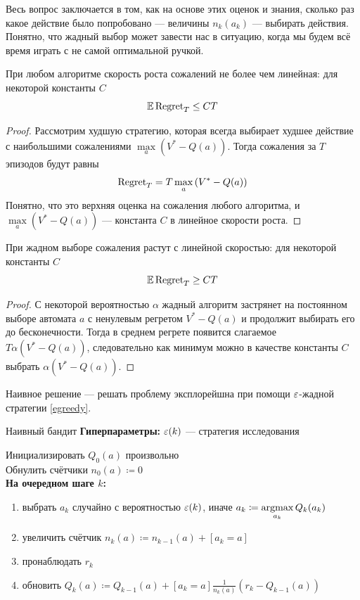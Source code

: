Весь вопрос заключается в том, как на основе этих оценок и знания, сколько раз какое действие было попробовано --- величины $n_k(a_k)$ --- выбирать действия. Понятно, что жадный выбор может завести нас в ситуацию, когда мы будем всё время играть с не самой оптимальной ручкой.

\begin{proposition}
При любом алгоритме скорость роста сожалений не более чем линейная: для некоторой константы $C$
$$\mathbb{E} \operatorname{Regret}_T \le CT$$
\begin{proof}
Рассмотрим худшую стратегию, которая всегда выбирает худшее действие с наибольшими сожалениями $\max\limits_a \left( V^* - Q(a) \right)$. Тогда сожаления за $T$ эпизодов будут равны
$$\operatorname{Regret}_T = T \max\limits_a \left( V^* - Q(a) \right)$$
Понятно, что это верхняя оценка на сожаления любого алгоритма, и $\max\limits_a \left( V^* - Q(a) \right)$ --- константа $C$ в линейное скорости роста.
\end{proof}
\end{proposition}

\begin{proposition}
При жадном выборе сожаления растут с линейной скоростью: для некоторой константы $C$
$$\mathbb{E} \operatorname{Regret}_T \ge CT$$
\begin{proof}
С некоторой вероятностью $\alpha$ жадный алгоритм застрянет на постоянном выборе автомата $a$ с ненулевым регретом $V^* - Q(a)$ и продолжит выбирать его до бесконечности. Тогда в среднем регрете появится слагаемое $T \alpha (V^* - Q(a))$, следовательно как минимум можно в качестве константы $C$ выбрать $\alpha (V^* - Q(a))$.
\end{proof}
\end{proposition}

Наивное решение --- решать проблему эксплорейшна при помощи $\varepsilon$-жадной стратегии \ref{egreedy}.

\begin{algorithm}{Наивный бандит}
\textbf{Гиперпараметры:} $\varepsilon(k)$ --- стратегия исследования

\vspace{0.3cm}
Инициализировать $Q_0(a)$ произвольно \\
Обнулить счётчики $n_0(a) \coloneqq 0$ \\
\textbf{На очередном шаге $k$:}
\begin{enumerate}
    \item выбрать $a_k$ случайно с вероятностью $\varepsilon(k)$, иначе $a_k \coloneqq \mathop{\mathrm{argmax}}\limits_{a_k} Q_k(a_k)$
    \item увеличить счётчик $n_k(a) \coloneqq n_{k-1}(a) + [a_k = a]$
    \item пронаблюдать $r_k$
    \item обновить $Q_k(a) \coloneqq Q_{k-1}(a) + [a_k = a] \frac{1}{n_k(a)} \left( r_k - Q_{k-1}(a) \right)$
\end{enumerate}
\end{algorithm}

